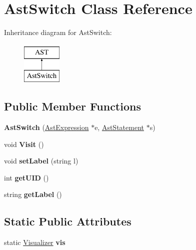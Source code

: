 \hypertarget{classAstSwitch}{\section{Ast\-Switch Class Reference}
\label{classAstSwitch}
}
Inheritance diagram for Ast\-Switch\-:\begin{figure}[H]
\begin{center}
\leavevmode
\includegraphics[height=2.000000cm]{classAstSwitch}
\end{center}
\end{figure}
\subsection*{Public Member Functions}
\begin{DoxyCompactItemize}
\item 
\hypertarget{classAstSwitch_a5a11f2c6bbed34a0deb5a150e8e53978}{{\bfseries Ast\-Switch} (\hyperlink{classAstExpression}{Ast\-Expression} $\ast$e, \hyperlink{classAstStatement}{Ast\-Statement} $\ast$s)}\label{classAstSwitch_a5a11f2c6bbed34a0deb5a150e8e53978}

\item 
\hypertarget{classAstSwitch_a12d5e48474fec08fbf41cb69cffd740a}{void {\bfseries Visit} ()}\label{classAstSwitch_a12d5e48474fec08fbf41cb69cffd740a}

\item 
\hypertarget{classAST_a71d680856e95ff89f55d5311a552eba6}{void {\bfseries set\-Label} (string l)}\label{classAST_a71d680856e95ff89f55d5311a552eba6}

\item 
\hypertarget{classAST_ab7a5b1d9f1c2de0d98deb356f724a42c}{int {\bfseries get\-U\-I\-D} ()}\label{classAST_ab7a5b1d9f1c2de0d98deb356f724a42c}

\item 
\hypertarget{classAST_aee029be902fffc927d16ccb03eb922ad}{string {\bfseries get\-Label} ()}\label{classAST_aee029be902fffc927d16ccb03eb922ad}

\end{DoxyCompactItemize}
\subsection*{Static Public Attributes}
\begin{DoxyCompactItemize}
\item 
\hypertarget{classAST_aca9e6637209b31e03a09c0d42f29bdfa}{static \hyperlink{classVisualizer}{Visualizer} {\bfseries vis}}\label{classAST_aca9e6637209b31e03a09c0d42f29bdfa}

\end{DoxyCompactItemize}
